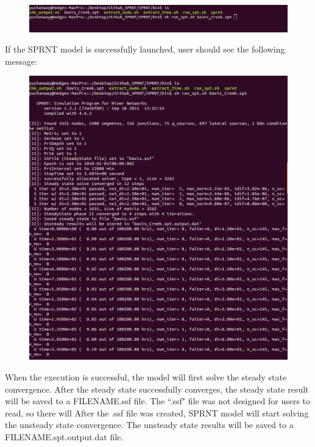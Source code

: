 \documentclass[12pt, letterpaper]{article}
\begin{document}
\begin{flushleft}
\begin{figure}[H]
	\centering
	\includegraphics[width = 1.0\textwidth]{figure/runsprnt.png} %
	\label{fig:process}%
\end{figure}

If the SPRNT model is successfully launched, user should see the following message:

\begin{figure}[H]
	\centering
	\includegraphics[width = 1.0\textwidth]{figure/startrun.png} %
	\label{fig:process}%
\end{figure}

When the execution is successful, the model will first solve the steady state convergence. After the steady state successfully converges, the steady state result will be saved to a FILENAME.ssf file. The ``.ssf" file was not designed for users to read, so there will After the .ssf file was created, SPRNT model will start solving the unsteady state convergence. The unsteady state results will be saved to a FILENAME.spt.output.dat file.



\end{flushleft}
\end{document}
